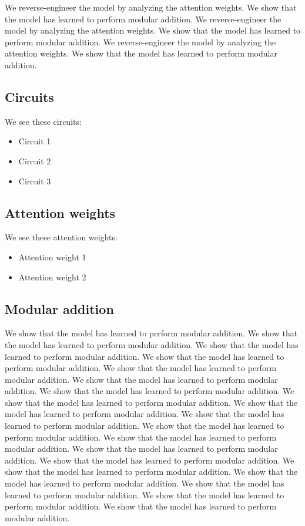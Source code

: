 \documentclass[11pt]{article} %
\begin{document}
\begin{multicols}{2}
  We reverse-engineer the model by analyzing the attention weights. We
  show that the model has learned to perform modular addition. We
  reverse-engineer the model by analyzing the attention weights. We show
  that the model has learned to perform modular addition. We
  reverse-engineer the model by analyzing the attention weights. We show
  that the model has learned to perform modular addition.

  \subsection{Circuits}\label{circuits}

  We see these circuits:

  \begin{itemize}
  \tightlist
  \item
    Circuit 1
  \item
    Circuit 2
  \item
    Circuit 3
  \end{itemize}

  \subsection{Attention weights}\label{attention-weights}

  We see these attention weights:

  \begin{itemize}
  \tightlist
  \item
    Attention weight 1
  \item
    Attention weight 2
  \end{itemize}

  \subsection{Modular addition}\label{modular-addition}

  We show that the model has learned to perform modular addition. We
  show that the model has learned to perform modular addition. We show
  that the model has learned to perform modular addition. We show that
  the model has learned to perform modular addition. We show that the
  model has learned to perform modular addition. We show that the model
  has learned to perform modular addition. We show that the model has
  learned to perform modular addition. We show that the model has
  learned to perform modular addition. We show that the model has
  learned to perform modular addition. We show that the model has
  learned to perform modular addition. We show that the model has
  learned to perform modular addition. We show that the model has
  learned to perform modular addition. We show that the model has
  learned to perform modular addition. We show that the model has
  learned to perform modular addition. We show that the model has
  learned to perform modular addition. We show that the model has
  learned to perform modular addition. We show that the model has
  learned to perform modular addition. We show that the model has
  learned to perform modular addition. We show that the model has
  learned to perform modular addition.


\end{multicols}
\end{document}
